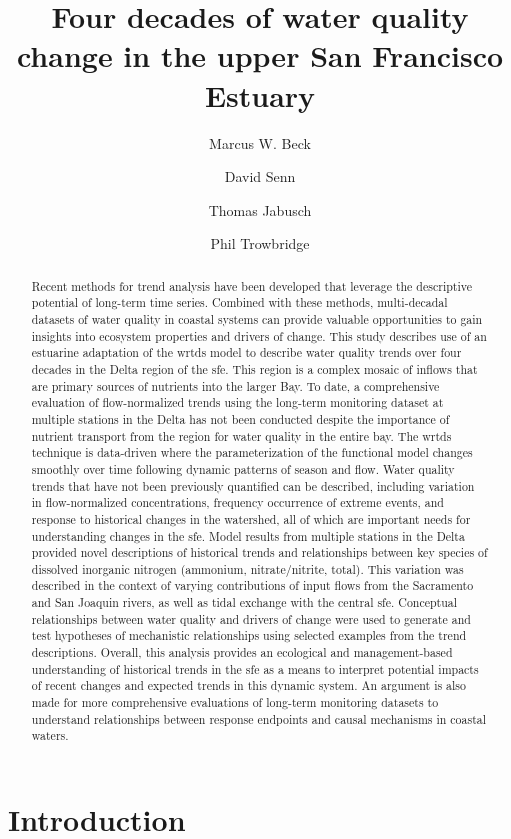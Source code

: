 \documentclass[journal = esthag, manuscript = article]{achemso}\usepackage[]{graphicx}\usepackage[]{color}
\author{Marcus W. Beck}
\affiliation{USEPA National Health and Environmental Effects Research Laboratory, Gulf Ecology Division, Gulf Breeze, FL}
\author{David Senn}
\author{Thomas Jabusch}
\author{Phil Trowbridge}
\affiliation{San Francisco Estuary Institute, Richmond, CA}
\title[Water quality change in the upper SFE]{Four decades of water quality change in the upper San Francisco Estuary}
\begin{document}
\linenumbers

\begin{abstract}
\noindent Recent methods for trend analysis have been developed that leverage the descriptive potential of long-term time series.  Combined with these methods, multi-decadal datasets of water quality in coastal systems can provide valuable opportunities to gain insights into ecosystem properties and drivers of change.  This study describes use of an estuarine adaptation of the \ac{wrtds} model to describe water quality trends over four decades in the Delta region of the \ac{sfe}. This region is a complex mosaic of inflows that are primary sources of nutrients into the larger Bay.  To date, a comprehensive evaluation of flow-normalized trends using the long-term monitoring dataset at multiple stations in the Delta has not been conducted despite the importance of nutrient transport from the region for water quality in the entire bay.  The \ac{wrtds} technique is data-driven where the parameterization of the functional model changes smoothly over time following dynamic patterns of season and flow.  Water quality trends that have not been previously quantified can be described, including variation in flow-normalized concentrations, frequency occurrence of extreme events, and response to historical changes in the watershed, all of which are important needs for understanding changes in the \ac{sfe}.  Model results from multiple stations in the Delta provided novel descriptions of historical trends and relationships between key species of dissolved inorganic nitrogen (ammonium, nitrate/nitrite, total).  This variation was described in the context of varying contributions of input flows from the Sacramento and San Joaquin rivers, as well as tidal exchange with the central \ac{sfe}.  Conceptual relationships between water quality and drivers of change were used to generate and test hypotheses of mechanistic relationships using selected examples from the trend descriptions. Overall, this analysis provides an ecological and management-based understanding of historical trends in the \ac{sfe} as a means to interpret potential impacts of recent changes and expected trends in this dynamic system.  An argument is also made for more comprehensive evaluations of long-term monitoring datasets to understand relationships between response endpoints and causal mechanisms in coastal waters.
\end{abstract}
\acresetall

\section{Introduction}
\end{document}
